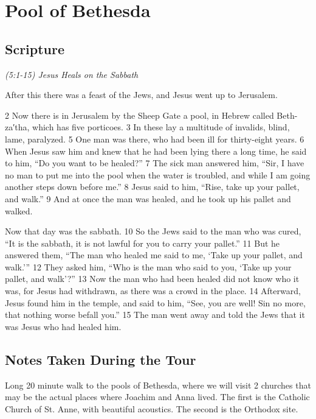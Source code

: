 \documentclass[letterpaper]{report}
\begin{document}
\clearpage
\section{Pool of Bethesda}
\begin{multicols}{2}
	\mbox{}
\end{multicols}
\subsection{Scripture}

{\centering
	\emph{(5:1-15) Jesus Heals on the Sabbath}\\
}
\begin{multicols}{2}
After this there was a feast of the Jews, and Jesus went up to Jerusalem.

2 Now there is in Jerusalem by the Sheep Gate a pool, in Hebrew called Beth-za′tha, which has five porticoes. 3 In these lay a multitude of invalids, blind, lame, paralyzed. 5 One man was there, who had been ill for thirty-eight years. 6 When Jesus saw him and knew that he had been lying there a long time, he said to him, “Do you want to be healed?” 7 The sick man answered him, “Sir, I have no man to put me into the pool when the water is troubled, and while I am going another steps down before me.” 8 Jesus said to him, “Rise, take up your pallet, and walk.” 9 And at once the man was healed, and he took up his pallet and walked.

Now that day was the sabbath. 10 So the Jews said to the man who was cured, “It is the sabbath, it is not lawful for you to carry your pallet.” 11 But he answered them, “The man who healed me said to me, ‘Take up your pallet, and walk.’” 12 They asked him, “Who is the man who said to you, ‘Take up your pallet, and walk’?” 13 Now the man who had been healed did not know who it was, for Jesus had withdrawn, as there was a crowd in the place. 14 Afterward, Jesus found him in the temple, and said to him, “See, you are well! Sin no more, that nothing worse befall you.” 15 The man went away and told the Jews that it was Jesus who had healed him.

\subsection{Notes Taken During the Tour}
Long 20 minute walk to the pools of Bethesda, where we will visit 2 churches that may be the actual places where Joachim and Anna lived. The first is the Catholic Church of St. Anne, with beautiful acoustics. The second is the Orthodox site.


\end{multicols}
\end{document}
